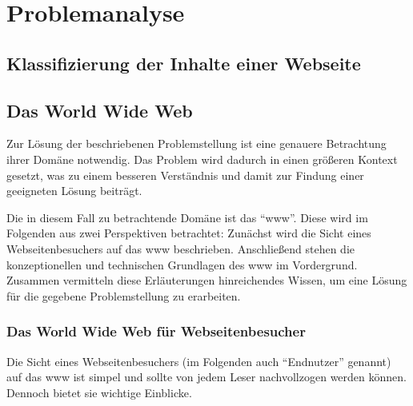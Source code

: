 \chapter{Problemanalyse}
    \label{chapter:ProblemAnalysis}
    \section{\imperia}
    \section{\wordpress}
    \section{Klassifizierung der Inhalte einer Webseite}

    
    \section{Das World Wide Web}
        \label{section:TheWWW}
        Zur Lösung der beschriebenen Problemstellung ist eine genauere
        Betrachtung ihrer Domäne notwendig.
        Das Problem wird dadurch in einen größeren Kontext gesetzt,
        was zu einem besseren Verständnis und damit zur Findung
        einer geeigneten Lösung beiträgt.

        Die in diesem Fall zu betrachtende Domäne ist das "`\gls{www}"'.
        Diese wird im Folgenden aus zwei Perspektiven betrachtet:
        Zunächst wird die Sicht eines Webseitenbesuchers auf das \gls{www} beschrieben.
        Anschließend stehen die konzeptionellen und technischen Grundlagen
        des \gls{www} im Vordergrund.
        Zusammen vermitteln diese Erläuterungen hinreichendes Wissen,
        um eine Lösung für die gegebene Problemstellung zu erarbeiten.

        \subsection{Das World Wide Web für Webseitenbesucher}
            \label{section:enduserViewOnWWW}
            Die Sicht eines Webseitenbesuchers (im Folgenden auch "`Endnutzer"' genannt)
            auf das \gls{www} ist simpel und sollte von jedem Leser nachvollzogen werden können.
            Dennoch bietet sie wichtige Einblicke.

